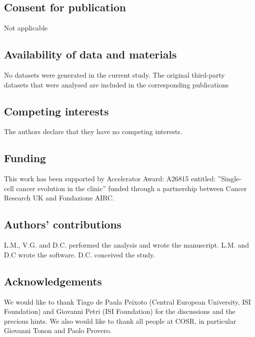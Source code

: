 \documentclass[10pt]{article}
\begin{document}
\subsection*{Consent for publication}
Not applicable

\subsection*{Availability of data and materials}
No datasets were generated in the current study. The original third-party datasets that were analysed are included in the corresponding publications \cite{plass_2018,  mereu_2020, Tian_2019, paul_2015, Zeisel_2015, Bastidas_Ponce_2019, Baron_2016, Aizarani_2019} 

\subsection*{Competing interests}
The authors declare that they have no competing interests.

\subsection*{Funding}
This work has been supported by Accelerator Award: A26815 entitled: ”Single-cell cancer evolution in the clinic” funded through a partnership between Cancer Research UK and Fondazione AIRC.

\subsection*{Authors' contributions}
L.M., V.G. and D.C. performed the analysis and wrote the manuscript. L.M. and D.C wrote the software. D.C. conceived the study.

\subsection*{Acknowledgements}
We would like to thank Tiago de Paula Peixoto (Central European University, ISI Foundation) and Giovanni Petri (ISI Foundation) for the discussions and the precious hints. We also would like to thank all people at COSR, in particular Giovanni Tonon and Paolo Provero.


\end{document}
